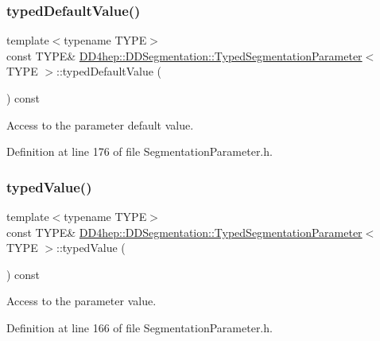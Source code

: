 \subsubsection{\texorpdfstring{typed\+Default\+Value()}{typedDefaultValue()}}
{\footnotesize\ttfamily template$<$typename T\+Y\+PE$>$ \\
const T\+Y\+PE\& \hyperlink{class_d_d4hep_1_1_d_d_segmentation_1_1_typed_segmentation_parameter}{D\+D4hep\+::\+D\+D\+Segmentation\+::\+Typed\+Segmentation\+Parameter}$<$ T\+Y\+PE $>$\+::typed\+Default\+Value (\begin{DoxyParamCaption}{ }\end{DoxyParamCaption}) const\hspace{0.3cm}{\ttfamily [inline]}}



Access to the parameter default value. 



Definition at line 176 of file Segmentation\+Parameter.\+h.

\hypertarget{class_d_d4hep_1_1_d_d_segmentation_1_1_typed_segmentation_parameter_a2fccafb9e339bc5e1f48b7e1d2d7da1a}{}\label{class_d_d4hep_1_1_d_d_segmentation_1_1_typed_segmentation_parameter_a2fccafb9e339bc5e1f48b7e1d2d7da1a} 
\subsubsection{\texorpdfstring{typed\+Value()}{typedValue()}}
{\footnotesize\ttfamily template$<$typename T\+Y\+PE$>$ \\
const T\+Y\+PE\& \hyperlink{class_d_d4hep_1_1_d_d_segmentation_1_1_typed_segmentation_parameter}{D\+D4hep\+::\+D\+D\+Segmentation\+::\+Typed\+Segmentation\+Parameter}$<$ T\+Y\+PE $>$\+::typed\+Value (\begin{DoxyParamCaption}{ }\end{DoxyParamCaption}) const\hspace{0.3cm}{\ttfamily [inline]}}



Access to the parameter value. 



Definition at line 166 of file Segmentation\+Parameter.\+h.



